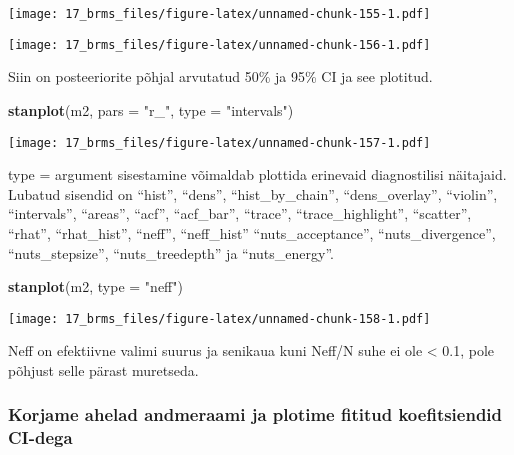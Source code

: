 \documentclass[]{article}
\newenvironment{Shaded}{\begin{snugshade}}{\end{snugshade}}
\newcommand{\KeywordTok}[1]{\textcolor[rgb]{0.13,0.29,0.53}{\textbf{#1}}}
\newcommand{\DataTypeTok}[1]{\textcolor[rgb]{0.13,0.29,0.53}{#1}}
\newcommand{\StringTok}[1]{\textcolor[rgb]{0.31,0.60,0.02}{#1}}
\newcommand{\OperatorTok}[1]{\textcolor[rgb]{0.81,0.36,0.00}{\textbf{#1}}}
\newcommand{\NormalTok}[1]{#1}
\begin{document}
\texttt{[image: 17\_brms\_files/figure-latex/unnamed-chunk-155-1.pdf]}

\begin{Shaded}
\end{Shaded}

\texttt{[image: 17\_brms\_files/figure-latex/unnamed-chunk-156-1.pdf]}

Siin on posteeriorite põhjal arvutatud 50\% ja 95\% CI ja see plotitud.

\begin{Shaded}
\begin{Highlighting}[]
\KeywordTok{stanplot}\NormalTok{(m2, }\DataTypeTok{pars =} \StringTok{"r_"}\NormalTok{, }\DataTypeTok{type =} \StringTok{"intervals"}\NormalTok{)}
\end{Highlighting}
\end{Shaded}

\texttt{[image: 17\_brms\_files/figure-latex/unnamed-chunk-157-1.pdf]}

type = argument sisestamine võimaldab plottida erinevaid diagnostilisi
näitajaid. Lubatud sisendid on ``hist'', ``dens'', ``hist\_by\_chain'',
``dens\_overlay'', ``violin'', ``intervals'', ``areas'', ``acf'',
``acf\_bar'', ``trace'', ``trace\_highlight'', ``scatter'', ``rhat'',
``rhat\_hist'', ``neff'', ``neff\_hist'' ``nuts\_acceptance'',
``nuts\_divergence'', ``nuts\_stepsize'', ``nuts\_treedepth'' ja
``nuts\_energy''.

\begin{Shaded}
\begin{Highlighting}[]
\KeywordTok{stanplot}\NormalTok{(m2, }\DataTypeTok{type =} \StringTok{"neff"}\NormalTok{)}
\end{Highlighting}
\end{Shaded}

\texttt{[image: 17\_brms\_files/figure-latex/unnamed-chunk-158-1.pdf]}

Neff on efektiivne valimi suurus ja senikaua kuni Neff/N suhe ei ole
\textless{} 0.1, pole põhjust selle pärast muretseda.

\subsubsection{Korjame ahelad andmeraami ja plotime fititud
koefitsiendid
CI-dega}\label{korjame-ahelad-andmeraami-ja-plotime-fititud-koefitsiendid-ci-dega}
\end{document}

